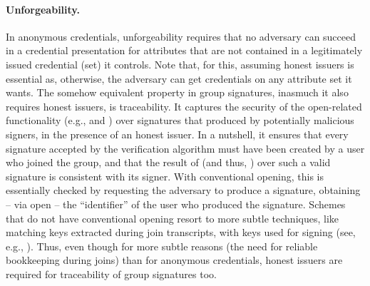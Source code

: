 \paragraph{Unforgeability.} In anonymous credentials, unforgeability requires
that no adversary can succeed in a credential presentation for attributes that
are not contained in a legitimately issued credential (set) it controls. Note
that, for this, assuming honest issuers is essential as, otherwise, the
adversary can get credentials on any attribute set it wants.
%
The somehow equivalent property in group signatures, inasmuch it also requires
honest issuers, is traceability. It captures the security of the
open-related functionality (e.g., \Open and \Judge) over signatures
that produced by potentially malicious signers, in the presence of an honest
issuer. In a nutshell, it ensures that every signature accepted by
the verification algorithm must have been created by a user who joined the
group, and that the result of \Open (and thus, \Judge) over such a valid
signature is consistent with its signer. With conventional opening, this is
essentially checked by requesting the adversary to produce a signature,
obtaining -- via open -- the ``identifier'' of the user who produced the
signature. Schemes
that do not have conventional opening resort to more subtle techniques, like
matching keys extracted during join transcripts, with keys used for signing
(see, e.g., \cite{dl21}). Thus, even though for more subtle reasons (the need
for reliable bookkeeping during joins) than for anonymous credentials, honest
issuers are required for traceability of group signatures too.

